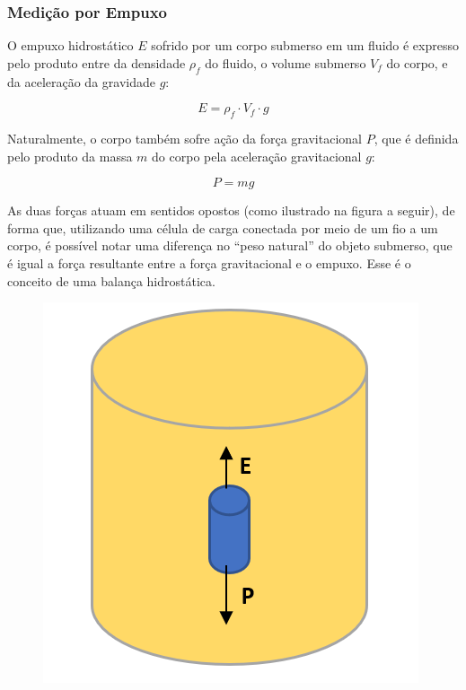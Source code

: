 \subsubsection{Medição por Empuxo}

O empuxo hidrostático \(E\) sofrido por um corpo submerso em um fluido é expresso pelo produto entre da densidade \(\rho_f\) do fluido, o volume submerso \(V_f\) do corpo, e da aceleração da gravidade \(g\): 

\begin{equation}
    E = \rho_f \cdot V_f \cdot g
\end{equation}

Naturalmente, o corpo também sofre ação da força gravitacional \(P\), que é definida pelo produto da massa \(m\) do corpo pela aceleração gravitacional \(g\):

\begin{equation}
    P = mg
\end{equation}

As duas forças atuam em sentidos opostos (como ilustrado na figura a seguir), de forma que, utilizando uma célula de carga conectada por meio de um fio a um corpo, é possível notar uma diferença no “peso natural” do objeto submerso, que é igual a força resultante entre a força gravitacional e o empuxo. Esse é o conceito de uma balança hidrostática.

\begin{figure}[h]
    \centering
    \includegraphics[scale=0.40]{figuras/projeto/hardware/empuxo.PNG}
    \label{fig:empuxo}
\end{figure}

